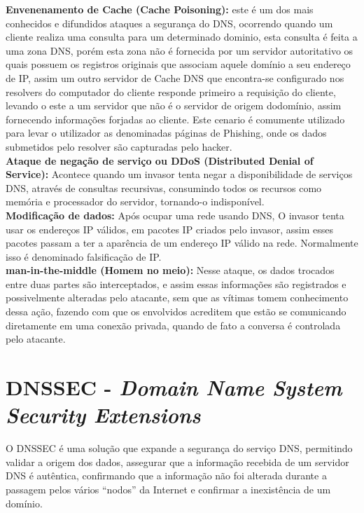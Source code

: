\documentclass[12pt,openright,a4paper]{report}
\begin{document}
{\textbf{Envenenamento de Cache (Cache Poisoning):} este é um dos mais conhecidos e difundidos ataques a segurança do DNS, ocorrendo quando um cliente realiza uma consulta para um determinado dominio, esta consulta é feita a uma zona DNS, porém esta zona não é fornecida por um servidor autoritativo os quais possuem os registros originais que associam aquele domínio a seu endereço de IP, assim um outro servidor de Cache DNS que encontra-se configurado nos resolvers do computador do cliente responde primeiro a requisição do cliente, levando o este a um servidor que não é o servidor de origem dodomínio, assim fornecendo informações forjadas ao cliente. Este cenario é comumente utilizado para levar o utilizador as denominadas páginas de Phishing, onde os dados submetidos pelo resolver são capturadas pelo hacker.\\

\textbf{ Ataque de negação de serviço ou DDoS (Distributed Denial of Service): }Acontece quando um invasor tenta negar a disponibilidade de serviços DNS, através de consultas recursivas, consumindo todos os recursos como memória e processador do servidor, tornando-o indisponível.\\

\textbf{ Modificação de dados: } Após ocupar uma rede usando DNS, O invasor tenta usar os endereços IP válidos, em pacotes IP criados pelo invasor, assim esses pacotes passam a ter a aparência de um endereço IP válido na rede. Normalmente isso é denominado falsificação de IP.\\

\textbf{ man-in-the-middle (Homem no meio): } Nesse ataque, os dados trocados entre duas partes são interceptados, e assim essas informações são registrados e possivelmente alteradas pelo atacante, sem que as vítimas tomem conhecimento dessa ação, fazendo com que os envolvidos acreditem que estão se comunicando diretamente em uma conexão privada, quando de fato a conversa é controlada pelo atacante.

\chapter{ DNSSEC  - \textit{Domain Name System Security Extensions}}
\label{chap_dnssec}

O DNSSEC é uma solução que expande a segurança do serviço DNS, permitindo validar a origem dos dados, assegurar que a informação recebida de um servidor DNS é autêntica, confirmando que a informação não foi alterada durante a passagem pelos vários “nodos” da Internet e confirmar a inexistência de um domínio.\\

}
\end{document}

